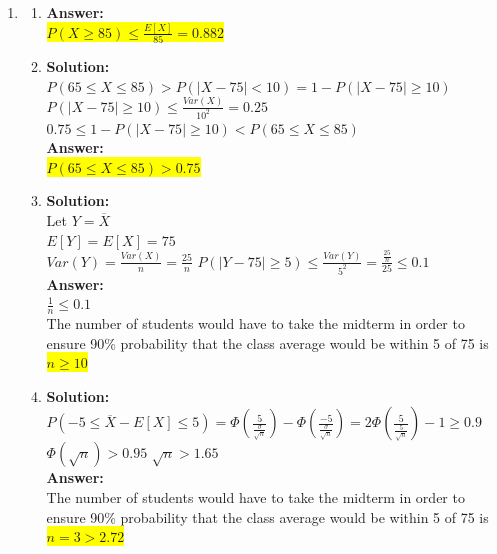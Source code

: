 \documentclass{article}
\newcommand{\myansw}{\textbf{Answer:}\\}
\newcommand{\mysolu}{\textbf{Solution:}\\}
\begin{document}
\begin{enumerate}
	
	\item
	\begin{enumerate}
		\item
		\myansw 
		\colorbox{yellow}{$P(X \geq 85) \leq \frac{E[X]}{85} = 0.882$}\\
		\item 
		\mysolu
		$P (65 \leq X \leq 85) > P(|X - 75|< 10) = 1 - P(|X - 75|\geq 10)$\\
		$P(|X - 75| \geq 10) \leq \frac{Var(X)}{10^2} = 0.25$\\
		$0.75 \leq 1 - P(|X - 75|\geq 10)< P (65 \leq X \leq 85) $\\
		\myansw
		\colorbox{yellow}{$ P (65 \leq X \leq 85) > 0.75$}\\
		\item
		\mysolu
		Let $Y = \overline{X}$\\
		$E[Y] = E[X] = 75$\\
		$Var(Y) = \frac{Var(X)}{n} = \frac{25}{n}$
		$P(|Y - 75| \geq 5) \leq \frac{Var(Y)}{5^2} = \frac{\frac{25}{n}}{25}\leq 0.1$\\
		\myansw
		$\frac{1}{n}\leq 0.1$\\
		The number of students would have to take the midterm in order to ensure 90\% probability that the class average would be within 5 of 75 is\\
		\colorbox{yellow}{$n \geq 10$}\\
		\item
		\mysolu
		$P(-5 \leq \overline{X} - E[X] \leq 5) = \Phi(\frac{5}{\frac{\sigma}{\sqrt{n}}})-\Phi(\frac{-5}{\frac{\sigma}{\sqrt{n}}})= 2\Phi(\frac{5}{\frac{5}{\sqrt{n}}}) - 1 \geq 0.9$\\
		$\Phi(\sqrt{n})>0.95$
		$\sqrt{n}>1.65$\\
		\myansw
		The number of students would have to take the midterm in order to ensure 90\% probability that the class average would be within 5 of 75 is\\
		\colorbox{yellow}{$n =3>2.72 $}\\
		
		
		
	\end{enumerate}
	
	
\end{enumerate}


\newpage
\end{document}
